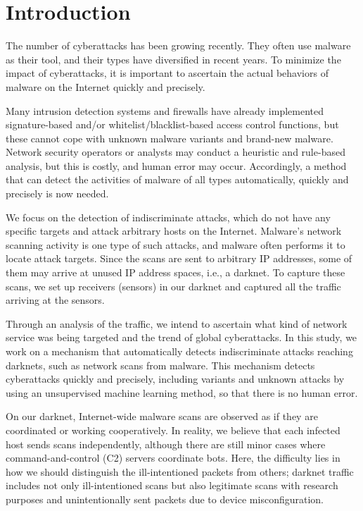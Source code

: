 \documentclass[conference]{IEEEtran}
\begin{document}
\section{Introduction}
\label{Introduction}
The number of cyberattacks has been growing recently.
They often use malware as their tool, and their types have diversified in recent years.
To minimize the impact of cyberattacks, it is important to ascertain the actual behaviors of malware on the Internet quickly and precisely.

Many intrusion detection systems and firewalls have already implemented signature-based and/or whitelist/blacklist-based access control functions, but these cannot cope with unknown malware variants and brand-new malware.
Network security operators or analysts may conduct a heuristic and rule-based analysis, but this is costly, and human error may occur.
Accordingly, a method that can detect the activities of malware of all types automatically, quickly and precisely is now needed.

We focus on the detection of indiscriminate attacks, which do not have any specific targets and attack arbitrary hosts on the Internet.
Malware's network scanning activity is one type of such attacks, and malware often performs it to locate attack targets.
Since the scans are sent to arbitrary IP addresses, some of them may arrive at unused IP address spaces, i.e., a darknet.
To capture these scans, we set up receivers (sensors) in our darknet and captured all the traffic arriving at the sensors.

Through an analysis of the traffic, we intend to ascertain what kind of network service was being targeted and the trend of global cyberattacks.
In this study, we work on a mechanism that automatically detects indiscriminate attacks reaching darknets, such as network scans from malware.
This mechanism detects cyberattacks quickly and precisely, including variants and unknown attacks by using an unsupervised machine learning method, so that there is no human error.


On our darknet, Internet-wide malware scans are observed as if they are coordinated or working cooperatively.
In reality, we believe that each infected host sends scans independently, although there are still minor cases where command-and-control (C2) servers coordinate bots.
Here, the difficulty lies in how we should distinguish the ill-intentioned packets from others; darknet traffic includes not only ill-intentioned scans but also legitimate scans with research purposes and unintentionally sent packets due to device misconfiguration.
\end{document}
